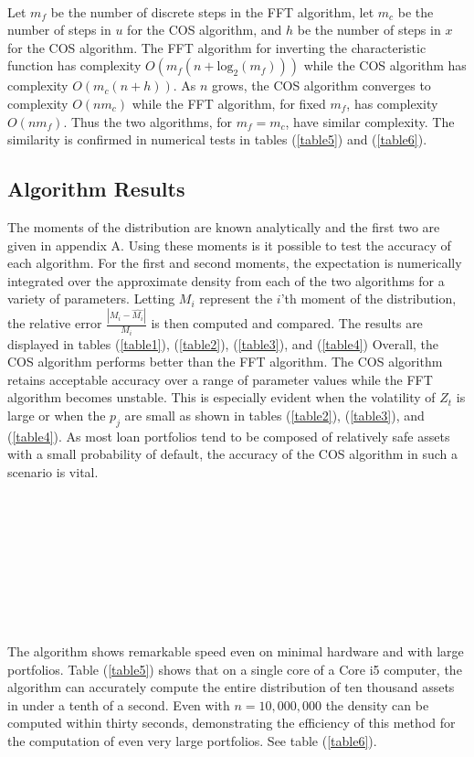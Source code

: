 \documentclass[12pt]{article}
\theoremstyle{definition}
\begin{document}
\\
 Let \(m_{f}\) be the number of discrete steps in the FFT algorithm, let \(m_{c}\) be the number of steps in \(u\) for the COS algorithm, and \(h\) be the number of steps in \(x\) for the COS algorithm. The FFT algorithm for inverting the characteristic function has complexity \(O(m_{f}(n+\text{log}_2 (m_{f})))\) while the COS algorithm has complexity \(O(m_{c} (n +h))\).   As \(n\) grows, the COS algorithm converges to complexity \(O(nm_c)\) while the FFT algorithm, for fixed \(m_f\), has complexity \(O(n m_f )\). Thus the two algorithms, for \(m_f=m_c\), have similar complexity.  The similarity is confirmed in numerical tests in tables (\ref{table5}) and (\ref{table6}).


\subsection{Algorithm Results}
The moments of the distribution are known analytically and the first two are given in appendix A.  Using these moments is it possible to test the accuracy of each algorithm.  For the first and second moments, the expectation is numerically integrated over the approximate density from each of the two algorithms for a variety of parameters.  Letting \(M_i\) represent the \(i\)'th moment of the distribution, the relative error \(\frac{| M_i-\hat{M_i}|}{M_i}\) is then computed and compared.  The results are displayed in tables (\ref{table1}), (\ref{table2}), (\ref{table3}), and (\ref{table4}) Overall, the COS algorithm performs better than the FFT algorithm.  The COS algorithm retains acceptable accuracy over a range of  parameter values while the FFT algorithm becomes unstable.  This is especially evident when the volatility of \(Z_t\) is large or when the \(p_j\) are small as shown in tables (\ref{table2}), (\ref{table3}), and (\ref{table4}).  As most loan portfolios tend to be composed of relatively safe assets with a small probability of default, the accuracy of the COS algorithm in such a scenario is vital.  
\\
\\

\\
\\

 \\
\\

\\
\\

\\
\\
The algorithm shows remarkable speed even on minimal hardware and with large portfolios.   Table (\ref{table5}) shows that on a single core of a Core i5 computer, the algorithm can accurately compute the entire distribution of ten thousand assets in under a tenth of a second.  Even with \(n=10,000,000\) the density can be computed within thirty seconds, demonstrating the efficiency of this method for the computation of even very large portfolios.  See table (\ref{table6}).
\\
\\

\\
\\

\end{document}

